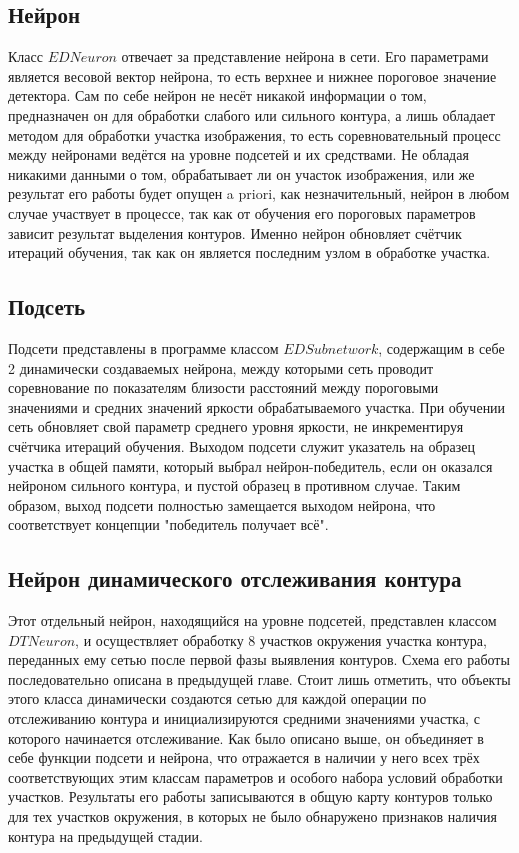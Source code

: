 \documentclass[a4paper,12pt]{report}
\begin{document}
\subsection{Нейрон}
Класс $EDNeuron$ отвечает за представление нейрона в сети. Его параметрами является весовой вектор нейрона, то есть верхнее и нижнее пороговое значение детектора. Сам по себе нейрон не несёт никакой информации о том, предназначен он для обработки слабого или сильного контура, а лишь обладает методом для обработки участка изображения, то есть соревновательный процесс между нейронами ведётся на уровне подсетей и их средствами. Не обладая никакими данными о том, обрабатывает ли он участок изображения, или же результат его работы будет опущен a priori, как незначительный, нейрон в любом случае участвует в процессе, так как от обучения его пороговых параметров зависит результат выделения контуров. Именно нейрон обновляет счётчик итераций обучения, так как он является последним узлом в обработке участка.

\subsection{Подсеть}
Подсети представлены в программе классом $EDSubnetwork$, содержащим в себе 2 динамически создаваемых нейрона, между которыми сеть проводит соревнование по показателям близости расстояний между пороговыми значениями и средних значений яркости обрабатываемого участка. При обучении сеть обновляет свой параметр среднего уровня яркости, не инкрементируя счётчика итераций обучения. Выходом подсети служит указатель на образец участка в общей памяти, который выбрал нейрон-победитель, если он оказался нейроном сильного контура, и пустой образец в противном случае. Таким образом, выход подсети полностью замещается выходом нейрона, что соответствует концепции "победитель получает всё".

\subsection{Нейрон динамического отслеживания контура}
Этот отдельный нейрон, находящийся на уровне подсетей, представлен классом $DTNeuron$, и осуществляет обработку 8 участков окружения участка контура, переданных ему сетью после первой фазы выявления контуров. Схема его работы последовательно описана в предыдущей главе. Стоит лишь отметить, что объекты этого класса динамически создаются сетью для каждой операции по отслеживанию контура и инициализируются средними значениями участка, с которого начинается отслеживание. Как было описано выше, он объединяет в себе функции подсети и нейрона, что отражается в наличии у него всех трёх соответствующих этим классам параметров и особого набора условий обработки участков. Результаты его работы записываются в общую карту контуров только для тех участков окружения, в которых не было обнаружено признаков наличия контура на предыдущей стадии.
 
\end{document}
